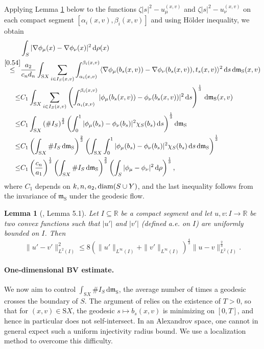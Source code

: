 \documentclass[a4paper,11pt]{article}
\numberwithin{equation}{section}
\theoremstyle{plain}
\newtheorem{lemma}[theorem]{Lemma}
\theoremstyle{definition}
\theoremstyle{remark}
\newcommand{\mm}{\mathfrak m}
\newcommand{\R}{\mathbb{R}}
\newcommand{\rS}{\mathrm{S}}
\newcommand{\diam}{\mathop{\rm diam}\nolimits}
\renewcommand{\d}{{\mathrm d}}
\begin{document}
	
	Applying Lemma \ref{l0.18} below to the functions $\zeta|s|^2-u_\mu^{(x,v)}$ and $\zeta|s|^2-u_\nu^{(x,v)}$ on each compact segment $[\alpha_i(x,v),\beta_i(x,v)]$ and using H\"{o}lder inequality, we obtain
	\begin{equation}\label{0.55}
		\begin{aligned}
			&\int_S |\nabla\phi_\mu(x)-\nabla\phi_\nu(x)|^2\,\d\rho(x)\\
			\mathop{\leq}^{\eqref{0.54}}& \frac{a_2}{c_nd_n}\int_{{\rS}X}\sum_{i\in  I_S(x,v)}\int_{\alpha_i(x,v)}^{\beta_i(x,v)}\langle\nabla\phi_\mu(b_s(x,v))-\nabla\phi_\nu(b_s(x,v)),t_s(x,v)\rangle^2\,\d s \,\d\mm_\rS(x,v)\\
			\leq&C_1 \int_{{\rS}X}\sum_{i\in  I_S(x,v)}\left(\int_{\alpha_i(x,v)}^{\beta_i(x,v)}|\phi_\mu(b_s(x,v))-\phi_\nu(b_s(x,v))|^2\,\d s\right)^\frac{1}{3}\,\d\mm_\rS(x,v)\\
			\leq&C_1 \int_{{\rS}X}\left(\# I_S\right)^\frac{2}{3}\left(\int_0^1|\phi_\mu(b_s)-\phi_\nu(b_s)|^2\chi_S(b_s)\,\d s\right)^\frac{1}{3}\d\mm_\rS\\
			\leq&C_1 \left(\int_{{\rS}X}\# I_S\,\d\mm_\rS\right)^\frac{2}{3}\left(\int_{{\rS}X}\int_0^1|\phi_\mu(b_s)-\phi_\nu(b_s)|^2\chi_S(b_s)\,\d s \,\d\mm_\rS\right)^\frac{1}{3}\\
			\leq&C_1 \left(\frac{c_n}{a_1}\right)^\frac{1}{3}\left(\int_{{\rS}X}\# I_S\,\d\mm_\rS\right)^\frac{2}{3}\left(\int_S|\phi_\mu-\phi_\nu|^2\,\d\rho\right)^\frac{1}{3},
		\end{aligned}
	\end{equation}
	where $C_1$ depends on $k,n,a_2, \diam(S\cup Y)$, and the last inequality follows from the invariance of $\mm_\rS$ under the geodesic flow.
	
	\begin{lemma}[\cite{zbMATH07794624}, Lemma 5.1]\label{l0.18}
		Let $I\subseteq \R$ be a compact segment and let $u,v: I\rightarrow\R$ be two convex functions such that $|u'|$ and $|v'|$ (defined a.e. on $I$) are uniformly bounded on $I$. Then
		\begin{equation*}
			\|u'-v'\|_{L^2(I)}^2\leq 8 (\|u'\|_{L^\infty(I)}+\|v'\|_{L^\infty(I)})^\frac{4}{3}\|u-v\|_{L^2(I)}^\frac{2}{3}.
		\end{equation*}
	\end{lemma}
	\paragraph{One-dimensional BV estimate.}
	
	
	We now aim to control $\int_{{\rS}X}\# I_S\,\d\mm_\rS$,  the average number of times a geodesic crosses the boundary of $S$. The argument of    \cite[Proposition 4.3]{arXiv:2504.05412} relies  on the existence of $T >0$, so that for $(x,v)\in {\rS}X$, the geodesic $s \mapsto b_s(x,v)$ is minimizing on $[0,T]$, and hence in particular does not self-intersect.  In an Alexandrov space, one cannot in general expect such a uniform injectivity radius bound. We  use a localization method to  overcome this difficulty.
	
\end{document}
